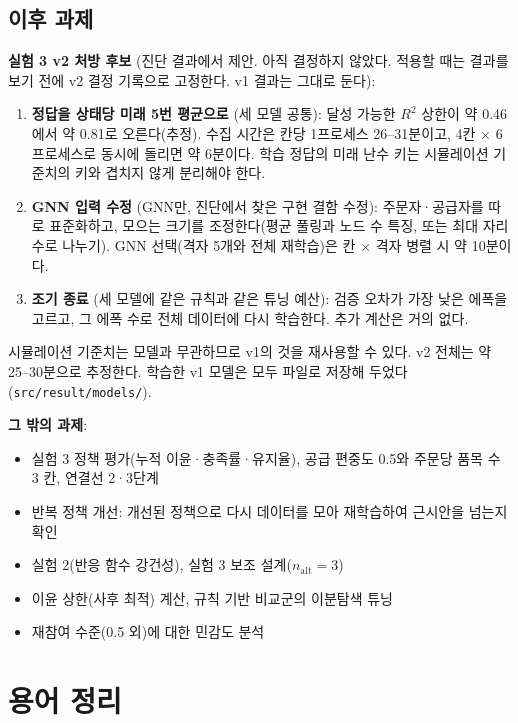 \documentclass[11pt,a4paper]{article}
\begin{document}
\subsection{이후 과제}\label{sec:next}

\textbf{실험 3 v2 처방 후보} (진단 결과에서 제안. 아직 결정하지 않았다. 적용할 때는 결과를 보기 전에 v2 결정 기록으로 고정한다.
v1 결과는 그대로 둔다):
\begin{enumerate}[leftmargin=1.5em]
  \item \textbf{정답을 상태당 미래 5번 평균으로} (세 모델 공통): 달성 가능한 $R^2$ 상한이 약 0.46에서 약 0.81로 오른다(추정).
        수집 시간은 칸당 1프로세스 26--31분이고, 4칸 $\times$ 6프로세스로 동시에 돌리면 약 6분이다.
        학습 정답의 미래 난수 키는 시뮬레이션 기준치의 키와 겹치지 않게 분리해야 한다.
  \item \textbf{GNN 입력 수정} (GNN만, 진단에서 찾은 구현 결함 수정):
        주문자·공급자를 따로 표준화하고, 모으는 크기를 조정한다(평균 풀링과 노드 수 특징, 또는 최대 자리 수로 나누기).
        GNN 선택(격자 5개와 전체 재학습)은 칸 $\times$ 격자 병렬 시 약 10분이다.
  \item \textbf{조기 종료} (세 모델에 같은 규칙과 같은 튜닝 예산): 검증 오차가 가장 낮은 에폭을 고르고, 그 에폭 수로 전체 데이터에 다시 학습한다. 추가 계산은 거의 없다.
\end{enumerate}
시뮬레이션 기준치는 모델과 무관하므로 v1의 것을 재사용할 수 있다. v2 전체는 약 25--30분으로 추정한다.
학습한 v1 모델은 모두 파일로 저장해 두었다(\texttt{src/result/models/}).

\textbf{그 밖의 과제}:
\begin{itemize}[leftmargin=1.5em]
  \item 실험 3 정책 평가(누적 이윤·충족률·유지율), 공급 편중도 0.5와 주문당 품목 수 3 칸, 연결선 2·3단계
  \item 반복 정책 개선: 개선된 정책으로 다시 데이터를 모아 재학습하여 근시안을 넘는지 확인
  \item 실험 2(반응 함수 강건성), 실험 3 보조 설계($n_{\mathrm{alt}}=3$)
  \item 이윤 상한(사후 최적) 계산, 규칙 기반 비교군의 이분탐색 튜닝
  \item 재참여 수준(0.5 외)에 대한 민감도 분석
\end{itemize}

\appendix
\section{용어 정리}
\end{document}
